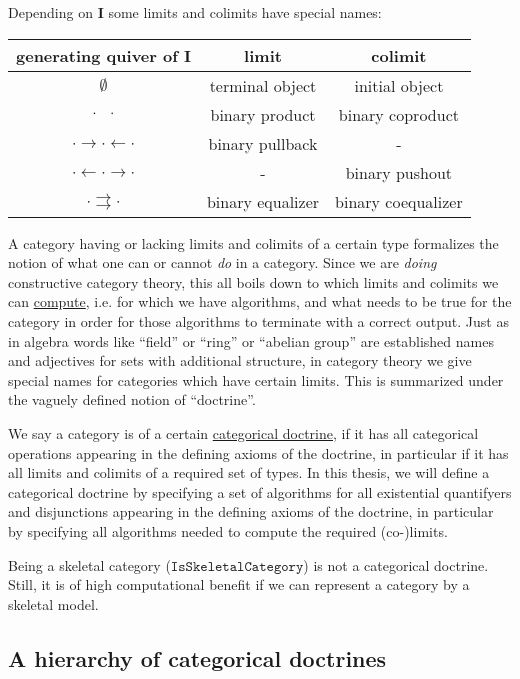 \begin{example}\label{ex:limits}
Depending on \textbf{I} some limits and colimits have special names:
\begin{center}
\begin{tabular}{c|c|c}
generating quiver of $\mathbf{I}$ & limit & colimit \\
\hline
$\emptyset$ & terminal object & initial object \\
$\cdot \text{\phantom{$\rightarrow$}} \cdot$ & binary product & binary coproduct \\
$\cdot \rightarrow \cdot \leftarrow \cdot$ & binary pullback & - \\
$\cdot \leftarrow \cdot \rightarrow \cdot$  & - & binary pushout \\
$ \cdot \rightrightarrows \cdot$ & binary equalizer & binary coequalizer
\end{tabular}
\end{center}
\end{example}

A category having or lacking limits and colimits of a certain type formalizes the notion of what one can or cannot \textit{do} in a category.
Since we are \textit{doing} constructive category theory, this all boils down to which limits and colimits we can \ul{compute}, i.e. for which we
have algorithms, and what needs to be true for the category in order for those algorithms to terminate with a correct output.
Just as in algebra words like ``field'' or ``ring'' or ``abelian group'' are established names and adjectives for sets with additional structure,
in category theory we give special names for categories which have certain limits. This is summarized under the vaguely defined
notion of ``doctrine''.

We say a category is of a certain \ul{categorical doctrine}, if it has all categorical operations appearing in the
defining axioms of the doctrine, in particular if it has all limits and colimits of a required set of types.
In this thesis, we will define a categorical doctrine by specifying a set of algorithms for all existential quantifyers and
disjunctions appearing in the defining axioms of the doctrine, in particular by specifying all algorithms needed to
compute the required (co-)limits.

Being a skeletal category ($\mathtt{IsSkeletalCategory}$) is not a categorical doctrine. Still, it is of high computational benefit
if we can represent a category by a skeletal model.

\subsection{A hierarchy of categorical doctrines}

